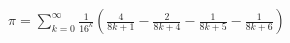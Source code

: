 \documentclass[preview]{standalone}
\begin{document}
\begin{align*}
\pi = \sum_{k=0}^{\infty} \frac{1}{16^k} \left(\frac{4}{8k+1} - \frac{2}{8k+4} - \frac{1}{8k+5} - \frac{1}{8k+6}\right)
\end{align*}
\end{document}
